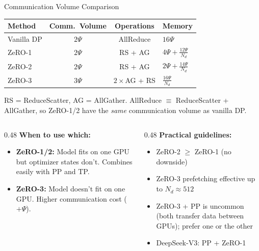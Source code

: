 \begin{frame}{Communication Volume Comparison}

  \begin{center}
  \renewcommand{\arraystretch}{1.3}
  \begin{tabular}{lccl}
    \toprule
    \textbf{Method} & \textbf{Comm.\ Volume} & \textbf{Operations} & \textbf{Memory} \\
    \midrule
    Vanilla DP & $2\Psi$ & AllReduce & $16\Psi$ \\
    ZeRO-1 & $2\Psi$ & RS + AG & $4\Psi + \frac{12\Psi}{N_d}$ \\
    ZeRO-2 & $2\Psi$ & RS + AG & $2\Psi + \frac{14\Psi}{N_d}$ \\
    ZeRO-3 & $3\Psi$ & $2\times$AG + RS & $\frac{16\Psi}{N_d}$ \\
    \bottomrule
  \end{tabular}
  \end{center}

  \vspace{0.3em}
  RS = ReduceScatter, AG = AllGather.
  AllReduce $\equiv$ ReduceScatter + AllGather, so ZeRO-1/2 have the \emph{same} communication volume as vanilla DP.

  \vspace{0.5em}
  \begin{columns}
    \begin{column}{0.48\textwidth}
      \textbf{When to use which:}
      \begin{itemize}
        \item \textbf{ZeRO-1/2:} Model fits on one GPU but optimizer states don't. Combines easily with PP and TP.
        \item \textbf{ZeRO-3:} Model doesn't fit on one GPU. Higher communication cost ($+\Psi$).
      \end{itemize}
    \end{column}
    \begin{column}{0.48\textwidth}
      \textbf{Practical guidelines:}
      \begin{itemize}
        \item ZeRO-2 $\geq$ ZeRO-1 (no downside)
        \item ZeRO-3 prefetching effective up to $N_d \approx 512$
        \item ZeRO-3 + PP is uncommon (both transfer data between GPUs); prefer one or the other
        \item DeepSeek-V3: PP + ZeRO-1
      \end{itemize}
    \end{column}
  \end{columns}
\end{frame}

